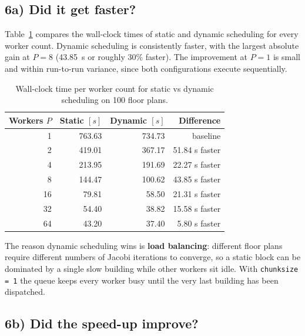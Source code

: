 \documentclass[11pt,a4paper]{article}
\begin{document}
\subsection*{6a) Did it get faster?}

Table~\ref{tab:task6-comparison} compares the wall-clock times of static and
dynamic scheduling for every worker count. Dynamic scheduling is consistently
faster, with the largest absolute gain at \(P = 8\) (\SI{43.85}{\second} or
roughly 30\% faster). The improvement at \(P = 1\) is small and within
run-to-run variance, since both configurations execute sequentially.

\begin{table}[H]
    \centering
    \begin{tabular}{rrrr}
        \toprule
        Workers \(P\) & Static \([s]\) & Dynamic \([s]\) & Difference \\
        \midrule
        1  & 763.63 & 734.73 & baseline \\
        2  & 419.01 & 367.17 & 51.84 s faster \\
        4  & 213.95 & 191.69 & 22.27 s faster \\
        8  & 144.47 & 100.62 & 43.85 s faster \\
        16 & 79.81  & 58.50  & 21.31 s faster \\
        32 & 54.40  & 38.82  & 15.58 s faster \\
        64 & 43.20  & 37.40  & 5.80 s faster \\
        \bottomrule
    \end{tabular}
    \caption{Wall-clock time per worker count for static vs dynamic scheduling
    on 100 floor plans.}
    \label{tab:task6-comparison}
\end{table}

The reason dynamic scheduling wins is \textbf{load balancing}: different floor
plans require different numbers of Jacobi iterations to converge, so a static
block can be dominated by a single slow building while other workers sit idle.
With \texttt{chunksize = 1} the queue keeps every worker busy until the very
last building has been dispatched.

\subsection*{6b) Did the speed-up improve?}
\end{document}
